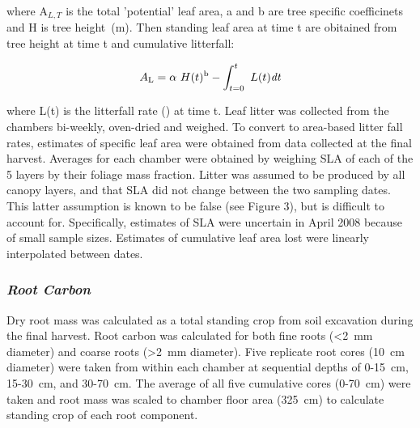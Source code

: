 \documentclass[a4paper]{article}
\begin{document}
where $\text{A}_{L,T}$ is the total 'potential' leaf area, a and b are tree specific coefficinets and H is tree height~(m). Then standing leaf area at time t are obitained from tree height at time t and cumulative litterfall:

\begin{equation}  A\textsubscript{L} = \alpha~H(t)\textsuperscript{b} - \int_{t=0}^t~L(t)\textit{dt}
\label{eq:leafarea2}
\end{equation}

where L(t) is the litterfall rate () at time t. Leaf litter was collected from the chambers bi-weekly, oven-dried and weighed. To convert to area-based litter fall rates, estimates of specific leaf area were obtained from data collected at the final harvest. Averages for each chamber were obtained by weighing SLA of each of the 5 layers by their foliage mass fraction. Litter was assumed to be produced by all canopy layers, and that SLA did not change between the two sampling dates. This latter assumption is known to be false (see Figure 3), but is difficult to account for. Specifically, estimates of SLA were uncertain in April 2008 because of small sample sizes. Estimates of cumulative leaf area lost were linearly interpolated between dates.

\subsubsection*{\textit{Root Carbon}}

Dry root mass was calculated as a total standing crop from soil excavation during the final harvest.  Root carbon was calculated for both fine roots (<2~mm diameter) and coarse roots (>2~mm diameter).  Five replicate root cores (10~cm diameter) were taken from within each chamber at sequential depths of 0-15~cm, 15-30~cm, and 30-70~cm.  The average of all five cumulative cores (0-70~cm) were taken and root mass was scaled to chamber floor area (325~cm) to calculate standing crop of each root component.
\end{document}
